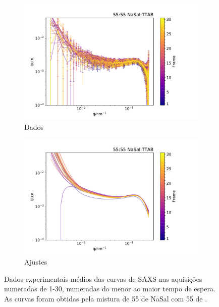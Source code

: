 	\begin{figure}[h]
		\begin{subfigure}[t]{0.5\textwidth}
			\centering
			\includegraphics[width=\textwidth]{imagens/saxs/TR_saxs_55_55_dados.pdf}
			\caption{Dados}
			\label{fig:saxs_tr_55_d}
		\end{subfigure}%
		\begin{subfigure}[t]{0.5\textwidth}
			\centering
			\includegraphics[width=\textwidth]{imagens/saxs/TR_saxs_55_55_ajuste.pdf}
			\caption{Ajustes}
			\label{fig:saxs_tr_55_a}
		\end{subfigure}
		\caption{Dados experimentais médios das curvas de SAXS nas aquisições numeradas de 1-30, numeradas do menor ao maior tempo de espera. As curvas foram obtidas pela mistura de 55 \mM{} de NaSal com 55\mM{} de \TTAB.}
		\label{fig:saxs_tr_55}
	\end{figure} 

